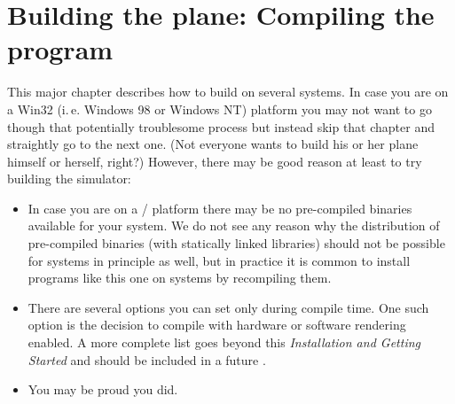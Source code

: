 
\chapter{Building the plane: Compiling the program\label{building}}

This major chapter describes how to build \FlightGear on several systems. In case you are
on a Win32 (i.\,e. Windows 98 or Windows NT) platform you may not want to go though that
potentially troublesome process but instead skip that chapter and straightly go to the
next one. (Not everyone wants to build his or her plane himself or herself, right?)
However, there may be good reason at least to try building the simulator:

\begin{itemize}
\item In case you are on a / platform there may be no
pre-compiled binaries available for your system. We do not
see any reason why the distribution of pre-compiled binaries (with statically linked
libraries) should not be possible for  systems in principle as well, but in
practice it is common to install programs like this one on  systems by
recompiling them.

\item There are several options you can set only during
compile time. One such option is the decision to compile with
hardware or software  rendering enabled. A more
complete list goes beyond this \textit{Installation and Getting
Started} and should be included in a future
\textit{}.

\item You may be proud you did.
\end{itemize}

